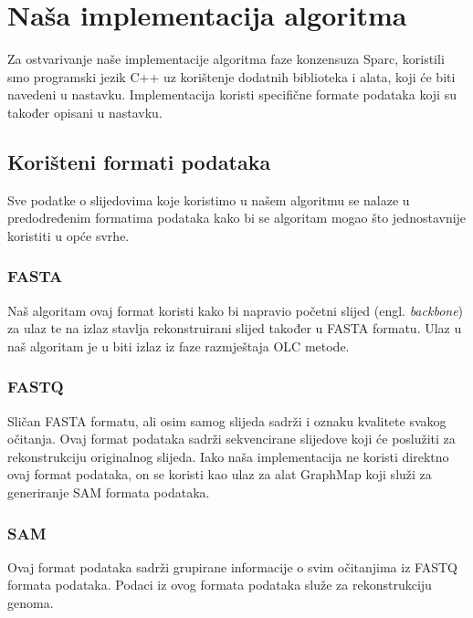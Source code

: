 \documentclass[times, utf8, seminar, numeric]{fer}
\begin{document}

\chapter{Naša implementacija algoritma}
Za ostvarivanje naše implementacije algoritma faze konzensuza Sparc, koristili smo programski jezik C++ uz korištenje dodatnih biblioteka i alata, koji će biti navedeni u nastavku. Implementacija koristi specifične formate podataka koji su također opisani u nastavku.
\section{Korišteni formati podataka}
Sve podatke o slijedovima koje koristimo u našem algoritmu se nalaze u predodređenim formatima podataka kako bi se algoritam mogao što jednostavnije koristiti u opće svrhe. 
\subsection{FASTA}
Naš algoritam ovaj format koristi kako bi napravio početni slijed (engl. \emph{backbone}) za ulaz te na izlaz stavlja rekonstruirani slijed također u FASTA formatu.
Ulaz u naš algoritam je u biti izlaz iz faze razmještaja OLC metode.
\subsection{FASTQ}
Sličan FASTA formatu, ali osim samog slijeda sadrži i oznaku kvalitete svakog očitanja.
Ovaj format podataka sadrži sekvencirane slijedove koji će poslužiti za rekonstrukciju originalnog slijeda.
Iako naša implementacija ne koristi direktno ovaj format podataka, on se koristi kao ulaz za alat GraphMap koji služi za generiranje SAM formata podataka.
\subsection{SAM}
Ovaj format podataka sadrži grupirane informacije o svim očitanjima iz FASTQ formata podataka. Podaci iz ovog formata podataka služe za rekonstrukciju genoma. 
\end{document}
